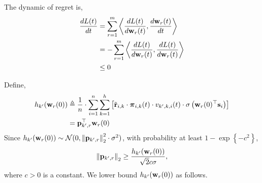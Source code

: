 \documentclass[10pt]{article}
\begin{document}
The dynamic of regret is,
\begin{equation*}
\begin{split}
	\frac{dL(t)}{dt} &= \sum\limits_{r=1}^{m}{ \left\langle \frac{dL(t)}{d {\mathbf{w}}_r(t)}, \frac{d {\mathbf{w}}_r(t)}{dt} \right\rangle} \\
	&= - \sum\limits_{r=1}^{m}{ \left\langle \frac{dL(t)}{d {\mathbf{w}}_r(t)}, \frac{dL(t)}{d {\mathbf{w}}_r(t)} \right\rangle} \\
	&\le 0
\end{split}
\end{equation*}
\fi

Define,
\begin{equation*}
\begin{split}
	h_{k^\prime}({\mathbf{w}}_r(0)) &\triangleq \frac{1}{n} \cdot \sum\limits_{i=1}^{n}{ \sum\limits_{k=1}^{h}{ \left[ {\tilde{\mathbf{r}}}_{i,k} \cdot {\boldsymbol{\pi}}_{i,k}(t) \cdot v_{k^\prime,k,i}(t) \cdot \sigma\left( {\mathbf{w}}_r(0)^\top {\mathbf{s}}_i \right) \right] } } \\
	&= {\mathbf{p}}_{k^\prime, r}^\top {\mathbf{w}}_r(0)
\end{split}
\end{equation*}
Since $h_{k^\prime}({\mathbf{w}}_r(0)) \sim {\mathcal{N}}(0, \left\| {\mathbf{p}}_{k^\prime, r} \right\|_2^2 \cdot \sigma^2 )$, with probability at least $1 - \exp\left\{ - c^2 \right\}$,
\begin{equation*}
	\left\| {\mathbf{p}}_{k^\prime, r} \right\|_2 \ge \frac{ h_{k^\prime}({\mathbf{w}}_r(0)) }{\sqrt{2} c \sigma},
\end{equation*}
where $c > 0$ is a constant. We lower bound $h_{k^\prime}({\mathbf{w}}_r(0))$ as follows. 
\fi
\end{document}
